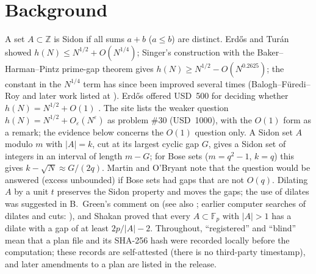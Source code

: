 \documentclass[11pt]{article}
\begin{document}
\section{Background}
A set $A\subset\mathbb Z$ is Sidon if all sums $a+b$ ($a\le b$) are distinct. Erd\H{o}s and Tur\'an \cite{ET} showed
$h(N)\le N^{1/2}+O(N^{1/4})$; Singer's construction \cite{Si} with the Baker--Harman--Pintz prime-gap theorem \cite{BHP} gives
$h(N)\ge N^{1/2}-O(N^{0.2625})$; the constant in the $N^{1/4}$ term has since been improved several times (Balogh--F\"uredi--Roy
\cite{BFR} and later work listed at \cite{EP}). Erd\H{o}s offered USD~500 for deciding whether
$h(N)=N^{1/2}+O(1)$ \cite{Guy,MO}. The site \cite{EP} lists the weaker question $h(N)=N^{1/2}+O_\varepsilon(N^\varepsilon)$ as
problem \#30 (USD~1000), with the $O(1)$ form as a remark; the evidence below concerns the $O(1)$ question only.
A Sidon set $A$ modulo $m$ with $|A|=k$, cut at its largest cyclic gap $G$, gives a Sidon set of integers in an interval of length
$m-G$; for Bose sets \cite{Bo} ($m=q^2-1$, $k=q$) this gives $k-\sqrt{N}\approx G/(2q)$. Martin and O'Bryant \cite{MO} note that
the question would be answered (excess unbounded) if Bose sets had gaps that are not $O(q)$. Dilating $A$ by a unit $t$ preserves
the Sidon property and moves the gaps; the use of dilates was suggested in B.~Green's comment on \cite{Go} (see also \cite{Gr}; earlier computer searches of dilates and cuts: \cite{Z,RD}), and Shakan \cite{Sh}
proved that every $A\subset\mathbb F_p$ with $|A|>1$ has a dilate with a gap of at least $2p/|A|-2$.
Throughout, ``registered'' and ``blind'' mean that a plan file and its SHA-256 hash were recorded locally before the computation; these records are self-attested (there is no third-party timestamp), and later amendments to a plan are listed in the release.
\end{document}
